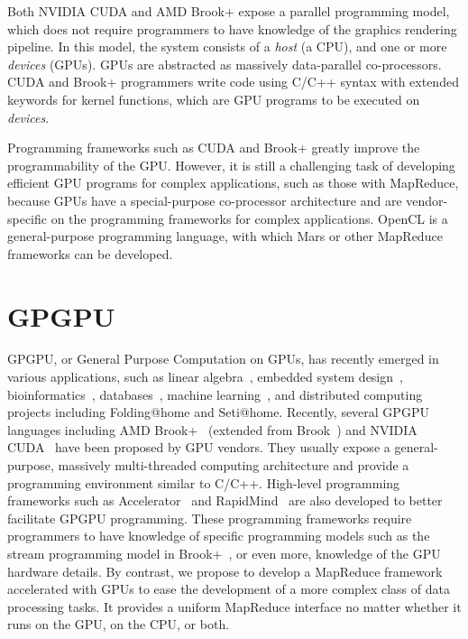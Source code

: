 Both NVIDIA CUDA and AMD Brook+ expose a parallel programming model, which does not require programmers to have knowledge of the
graphics rendering pipeline. In this model, the system consists of a
{\em host} (a CPU), and one or more {\em devices} (GPUs).
GPUs are abstracted as massively data-parallel co-processors.
CUDA and Brook+ programmers write code using C/C++ syntax with extended keywords for kernel functions,
which are GPU programs to be executed on {\em devices}.

Programming frameworks such as CUDA and Brook+ greatly improve
the programmability of the GPU.
However, it is still a challenging task of developing efficient GPU programs for complex applications, such as those with MapReduce, because GPUs have a special-purpose co-processor architecture and are vendor-specific on the programming frameworks for complex applications.
 OpenCL is a general-purpose programming language, with which Mars or other MapReduce frameworks can be developed.

\section{GPGPU}




GPGPU, or General Purpose Computation on GPUs, has recently emerged
in various applications, such as linear algebra~\cite{Jiang2005,Volkov2008}, embedded system design~\cite{Feng2007}, bioinformatics~\cite{Charalambous2005}, databases~\cite{Govindaraju2006,Govindaraju2004,He2008a}, machine learning~\cite{Chu2006}, and
distributed computing projects including Folding@home and Seti@home.
Recently, several GPGPU languages including AMD Brook+~\cite{BROOKPLUS} (extended from Brook~\cite{Buck2004}) and NVIDIA
CUDA~\cite{CUDA} have been proposed by GPU vendors. They usually
expose a general-purpose, massively multi-threaded computing
architecture and provide a programming environment similar to C/C++.
High-level programming frameworks such as Accelerator~\cite{Tarditi2006} and RapidMind~\cite{McCool2006} are also
developed to better facilitate GPGPU programming. These
programming frameworks require programmers to have knowledge of specific
programming models such as the stream programming model in Brook+~\cite{Buck2004}, or even more, knowledge of the GPU hardware
details. By contrast, we propose to develop a MapReduce framework accelerated with
GPUs to ease the development of a more complex class of data
processing tasks. It provides a uniform MapReduce interface no matter whether it runs on the GPU, on the CPU, or both.

